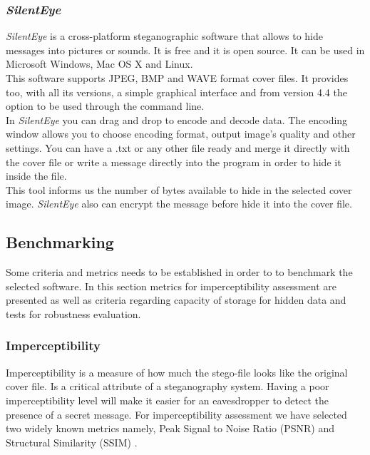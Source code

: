 \documentclass[11pt]{article}
\begin{document}
\subsubsection{\textit{SilentEye}}
\textit{SilentEye} is a cross-platform steganographic software that allows to hide messages into pictures or sounds. It is free and it is open source. It can be used in Microsoft Windows, Mac OS X and Linux. \\
This software supports JPEG, BMP and WAVE format cover files. It provides too, with all its versions, a simple graphical interface and from version 4.4 the option to be used through the command line. \\
In \textit{SilentEye} you can drag and drop to encode and decode data. The encoding window allows you to choose encoding format, output image’s quality and other settings. You can have a .txt or any other file ready and merge it directly with the cover file or write a message directly into the program in order to hide it inside the file.\\
This tool informs us the number of bytes available to hide in the selected cover image.
\textit{SilentEye} also can encrypt the message before hide it into the cover file. 


\subsection{Benchmarking}

Some criteria and metrics needs to be established in order to to benchmark the selected software.
In this section metrics for imperceptibility assessment are presented as well as criteria regarding capacity of storage for
hidden data and tests for robustness evaluation.

\subsubsection{Imperceptibility}

Imperceptibility is a measure of how much the stego-file
looks like the original cover file. Is a critical attribute of a steganography system. Having a poor imperceptibility level will make it 
easier for an eavesdropper to detect the presence of a secret message. For imperceptibility assessment we have selected
two widely known metrics namely, Peak Signal to Noise Ratio (PSNR) and Structural Similarity (SSIM) \cite{Rabie-2019}.
\end{document}
